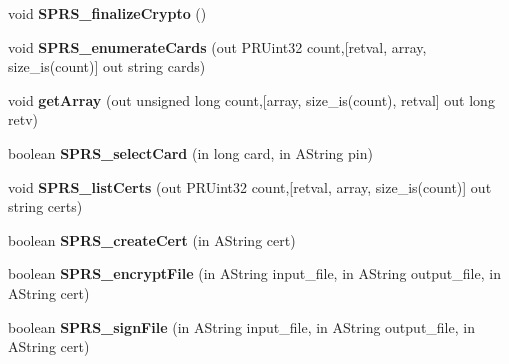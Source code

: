 \begin{DoxyCompactItemize}
\item 
\hypertarget{classnsISPRS__PKCS11__Wrapper_a64a6e7824caf4c175e8f1b4fb18c7f4e}{
void {\bfseries SPRS\_\-finalizeCrypto} ()}
\label{classnsISPRS__PKCS11__Wrapper_a64a6e7824caf4c175e8f1b4fb18c7f4e}

\item 
\hypertarget{classnsISPRS__PKCS11__Wrapper_aa9be6c1fd0973916152ad82fd60e186a}{
void {\bfseries SPRS\_\-enumerateCards} (out PRUint32 count,\mbox{[}retval, array, size\_\-is(count)\mbox{]} out string cards)}
\label{classnsISPRS__PKCS11__Wrapper_aa9be6c1fd0973916152ad82fd60e186a}

\item 
\hypertarget{classnsISPRS__PKCS11__Wrapper_a127c335a5ec8ba9ad64218beda932e49}{
void {\bfseries getArray} (out unsigned long count,\mbox{[}array, size\_\-is(count), retval\mbox{]} out long retv)}
\label{classnsISPRS__PKCS11__Wrapper_a127c335a5ec8ba9ad64218beda932e49}

\item 
\hypertarget{classnsISPRS__PKCS11__Wrapper_ae1d9a88278e5fc06fd68c36db061e814}{
boolean {\bfseries SPRS\_\-selectCard} (in long card, in AString pin)}
\label{classnsISPRS__PKCS11__Wrapper_ae1d9a88278e5fc06fd68c36db061e814}

\item 
\hypertarget{classnsISPRS__PKCS11__Wrapper_aaad4ef266e0a525e99763d32497e968e}{
void {\bfseries SPRS\_\-listCerts} (out PRUint32 count,\mbox{[}retval, array, size\_\-is(count)\mbox{]} out string certs)}
\label{classnsISPRS__PKCS11__Wrapper_aaad4ef266e0a525e99763d32497e968e}

\item 
\hypertarget{classnsISPRS__PKCS11__Wrapper_ae276d3e673f616d997e2f01efb61666e}{
boolean {\bfseries SPRS\_\-createCert} (in AString cert)}
\label{classnsISPRS__PKCS11__Wrapper_ae276d3e673f616d997e2f01efb61666e}

\item 
\hypertarget{classnsISPRS__PKCS11__Wrapper_aef0c4b224729d300b574673e4d5ed9b9}{
boolean {\bfseries SPRS\_\-encryptFile} (in AString input\_\-file, in AString output\_\-file, in AString cert)}
\label{classnsISPRS__PKCS11__Wrapper_aef0c4b224729d300b574673e4d5ed9b9}

\item 
\hypertarget{classnsISPRS__PKCS11__Wrapper_a12fd84a1bfdadca5898a97674abcc7d2}{
boolean {\bfseries SPRS\_\-signFile} (in AString input\_\-file, in AString output\_\-file, in AString cert)}
\label{classnsISPRS__PKCS11__Wrapper_a12fd84a1bfdadca5898a97674abcc7d2}


\end{DoxyCompactItemize}
